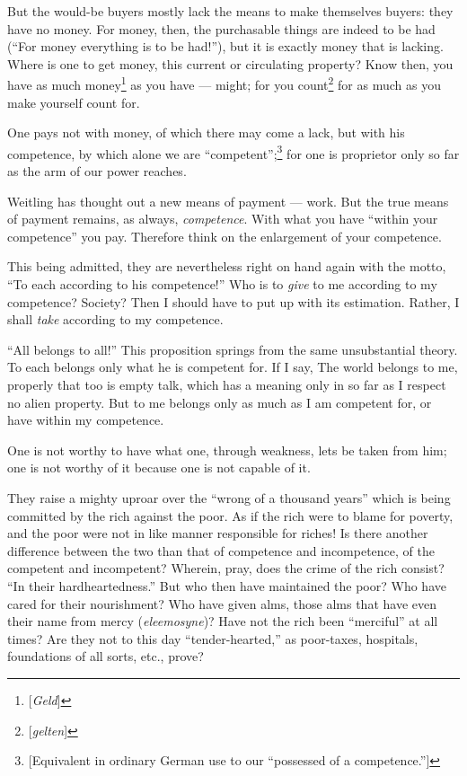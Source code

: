 But the would-be buyers mostly lack the means to make themselves buyers: they 
have no money. For money, then, the purchasable things are indeed to be had 
(``For money everything is to be had!''), but it is exactly money that is 
lacking. Where is one to get money, this current or circulating property? Know 
then, you have as much money\footnote{[\textit{Geld}]} as you have --- might; 
for you count\footnote{[\textit{gelten}]} for as much as you make yourself 
count for.

One pays not with money, of which there may come a lack, but with his 
competence, by which alone we are ``competent'';\footnote{[Equivalent in 
ordinary German use to our ``possessed of a competence.'']} for one is 
proprietor only so far as the arm of our power reaches.

Weitling has thought out a new means of payment --- work. But the true means of 
payment remains, as always, \textit{competence}. With what you have ``within 
your competence'' you pay. Therefore think on the enlargement of your 
competence.

This being admitted, they are nevertheless right on hand again with the motto, 
``To each according to his competence!'' Who is to \textit{give} to me 
according to my competence? Society? Then I should have to put up with its 
estimation. Rather, I shall \textit{take} according to my competence.

``All belongs to all!'' This proposition springs from the same unsubstantial 
theory. To each belongs only what he is competent for. If I say, The world 
belongs to me, properly that too is empty talk, which has a meaning only in so 
far as I respect no alien property. But to me belongs only as much as I am 
competent for, or have within my competence.

One is not worthy to have what one, through weakness, lets be taken from him; 
one is not worthy of it because one is not capable of it.

They raise a mighty uproar over the ``wrong of a thousand years'' which is 
being committed by the rich against the poor. As if the rich were to blame for 
poverty, and the poor were not in like manner responsible for riches! Is there 
another difference between the two than that of competence and incompetence, 
of the competent and incompetent? Wherein, pray, does the crime of the rich 
consist? ``In their hardheartedness.'' But who then have maintained the 
poor? Who have cared for their nourishment? Who have given alms, those alms 
that have even their name from mercy (\textit{eleemosyne})? Have not the rich 
been ``merciful'' at all times? Are they not to this day 
``tender-hearted,'' as poor-taxes, hospitals, foundations of all sorts, 
etc., prove?

